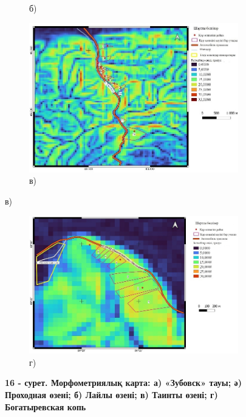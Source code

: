 \begin{figure}[H]
\begin{subfigure}[t]{0.42\textwidth}
        \caption*{б)}
    \end{subfigure}
    \begin{subfigure}[t]{0.42\textwidth}
        \centering
        \includegraphics[width=\textwidth]{media/ict2/image222}
        \caption*{в)}
    \end{subfigure}
\end{figure}
\begin{figure}[H]
    \centering
    \begin{subfigure}[t]{0.42\textwidth}
        \centering
        \includegraphics[width=\textwidth]{media/ict2/image223}
        \caption*{г)}
    \end{subfigure}
    \caption*{{\bfseries 16 - сурет. Морфометриялық карта: а) «Зубовск» тауы; ә) Проходная өзені; б) Лайлы өзені; в) Таинты өзені; г) Богатыревская копь}}
\end{figure}

